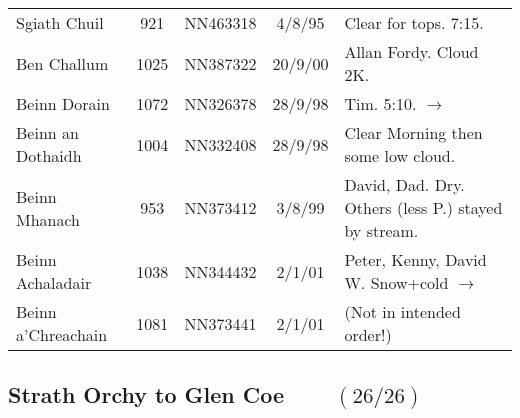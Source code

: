 \documentclass[10pt,a4paper]{article}
\begin{document}
\begin{tabular}{lcccp{6cm}}
Sgiath Chuil & 921  & NN463318&4/8/95&Clear for tops. 7:15.   \\
Ben Challum & 1025 & NN387322 &20/9/00& Allan Fordy. Cloud 2K.\\
Beinn Dorain & 1072 & NN326378 &28/9/98& Tim. 5:10. $\rightarrow$\\
Beinn an Dothaidh & 1004 & NN332408 &28/9/98& Clear Morning then some low cloud. \\
Beinn Mhanach & 953  & NN373412 &3/8/99&David, Dad. Dry. Others (less P.) stayed by stream.\\
Beinn Achaladair & 1038 & NN344432 &2/1/01&Peter, Kenny, David W. Snow+cold $\rightarrow$ \\
Beinn a'Chreachain & 1081 & NN373441 &2/1/01& (Not in intended order!)\\
\end{tabular}

\newpage

\subsection*{Strath Orchy to Glen Coe $\qquad (26/26)$}
\end{document}
